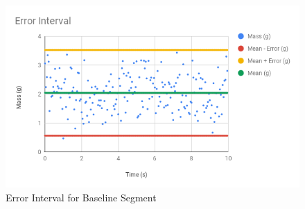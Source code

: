 \begin{figure} \label{figure.baseline.interval}
    \centering
    \includegraphics[scale=0.71]{images/00-intro/baseline-error-interval.png}
    \caption{Error Interval for Baseline Segment}
\end{figure}

